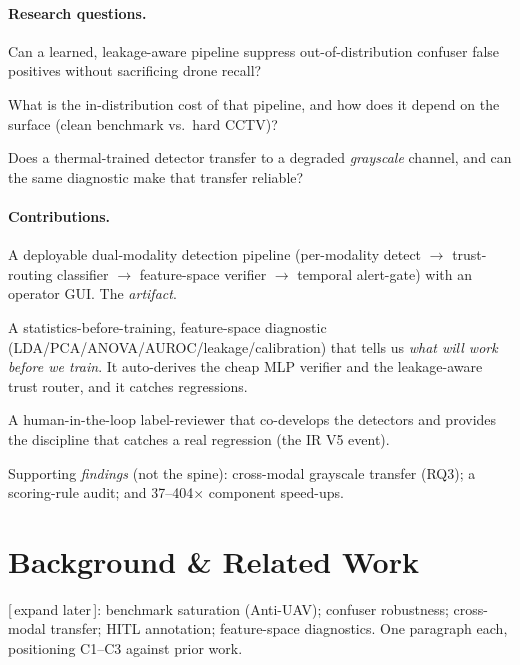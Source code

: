 \documentclass[11pt]{article}
\newcommand{\todo}[1]{{\small\textcolor{red!70!black}{[\,#1\,]}}}
\begin{document}
\paragraph{Research questions.}
\begin{description}[leftmargin=2.2em,itemsep=2pt]
  \item[RQ1] Can a learned, leakage-aware pipeline suppress out-of-distribution confuser
        false positives without sacrificing drone recall?
  \item[RQ2] What is the in-distribution cost of that pipeline, and how does it depend on the
        surface (clean benchmark vs.\ hard CCTV)?
  \item[RQ3] Does a thermal-trained detector transfer to a degraded \emph{grayscale} channel,
        and can the same diagnostic make that transfer reliable?
\end{description}

\paragraph{Contributions.}
\begin{description}[leftmargin=2.2em,itemsep=2pt]
  \item[C1 --- The pipeline + GUI.] A deployable dual-modality detection pipeline (per-modality
        detect $\rightarrow$ trust-routing classifier $\rightarrow$ feature-space verifier
        $\rightarrow$ temporal alert-gate) with an operator GUI. The \emph{artifact}.
  \item[C2 --- The Model MRI.] A statistics-before-training, feature-space diagnostic
        (LDA/PCA/ANOVA/AUROC/leakage/calibration) that tells us \emph{what will work before we
        train}. It auto-derives the cheap MLP verifier and the leakage-aware trust router, and
        it catches regressions.
  \item[C3 --- The HITL data engine.] A human-in-the-loop label-reviewer that co-develops the
        detectors and provides the discipline that catches a real regression (the IR V5 event).
\end{description}
Supporting \emph{findings} (not the spine): cross-modal grayscale transfer (RQ3); a scoring-rule
audit; and 37--404$\times$ component speed-ups.

\section{Background \& Related Work}
\label{sec:background}
\todo{expand later}: benchmark saturation (Anti-UAV); confuser robustness; cross-modal transfer;
HITL annotation; feature-space diagnostics. One paragraph each, positioning C1--C3 against prior work.
\end{document}
